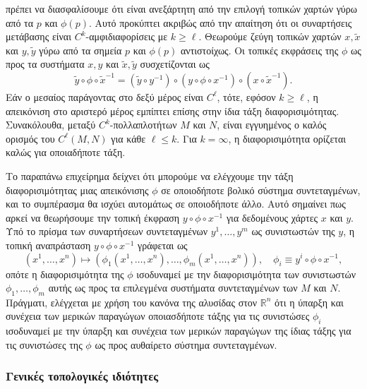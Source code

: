 \documentclass[11pt,a4paper,twoside,openright]{book}
\begin{document}
πρέπει να διασφαλίσουμε ότι είναι ανεξάρτητη από την επιλογή τοπικών χαρτών γύρω από τα $p$ και $\phi(p)$.
Αυτό προκύπτει ακριβώς από την απαίτηση
ότι οι συναρτήσεις μετάβασης είναι $C^k$-αμφιδιαφορίσεις με $k \ge \ell$.
Θεωρούμε ζεύγη τοπικών χαρτών $x, \tilde{x}$ και $y, \tilde{y}$
γύρω από τα σημεία $p$ και $\phi(p)$ αντιστοίχως.
Οι τοπικές εκφράσεις της $\phi$ ως προς τα συστήματα $x, y$
και $\tilde{x}, \tilde{y}$ συσχετίζονται ως
\begin{equation*}
\tilde{y} \circ \phi \circ \tilde{x}^{-1} = (\tilde{y} \circ y ^ {-1}) \circ (y \circ \phi \circ x ^ {-1}) \circ (x \circ \tilde{x} ^ {-1}).
\end{equation*}
Εάν ο μεσαίος παράγοντας στο δεξύ μέρος είναι $C^\ell$,
τότε, εφόσον $k \ge \ell$,
η απεικόνιση στο αριστερό μέρος εμπίπτει επίσης στην ίδια τάξη διαφορισιμότητας.
Συνακόλουθα, μεταξύ $C^k$-πολλαπλοτήτων $Μ$ και $N$,
είναι εγγυημένος ο καλός ορισμός του $C^\ell(M, N)$ για κάθε $\ell \le k$. Για $k=\infty$, η διαφορισιμότητα ορίζεται καλώς
για οποιαδήποτε τάξη.

Το παραπάνω επιχείρημα δείχνει ότι μπορούμε να ελέγχουμε την τάξη διαφορισιμότητας μιας απεικόνισης $\phi$ σε οποιοδήποτε βολικό σύστημα συντεταγμένων, και το συμπέρασμα θα ισχύει αυτομάτως σε οποιοδήποτε άλλο. Αυτό σημαίνει πως αρκεί να θεωρήσουμε την τοπική έκφραση
$y \circ \phi \circ x ^{-1}$ για δεδομένους χάρτες
$x$ και $y$.
Υπό το πρίσμα των συναρτήσεων συντεταγμένων $y^1, \dots, y^m$
ως συνιστωστών της $y$,
η τοπική αναπράσταση $y \circ \phi \circ x ^{-1}$ γράφεται ως
\begin{equation}\label{eq:local-representation}
(x^1, \dots, x^n) \mapsto
(\phi_1(x^1, \dots, x^n),
\dots,
\phi_m(x^1, \dots, x^n)),
\quad
\phi_i \equiv y^i \circ \phi \circ x ^ {-1},
\end{equation}
οπότε η διαφορισιμότητα της $\phi$
ισοδυναμεί με την διαφορισιμότητα
των συνιστωστών $\phi_1, \dots, \phi_m$ αυτής
ως προς τα επιλεγμένα συστήματα συντεταγμένων των $Μ$ και $N$.
Πράγματι, ελέγχεται
με χρήση του κανόνα της αλυσίδας στον $\mathbb{R}^n$
ότι η ύπαρξη και συνέχεια των μερικών παραγώγων
οποιασδήποτε τάξης για τις συνιστώσες $\phi_i$
ισοδυναμεί με την ύπαρξη και συνέχεια
των μερικών παραγώγων της ίδιας τάξης
για τις συνιστώσες της $\phi$ ως προς αυθαίρετο σύστημα συντεταγμένων.

\subsubsection{Γενικές τοπολογικές ιδιότητες}
	\label{sec:generic-topological-properties}
	
\end{document}
